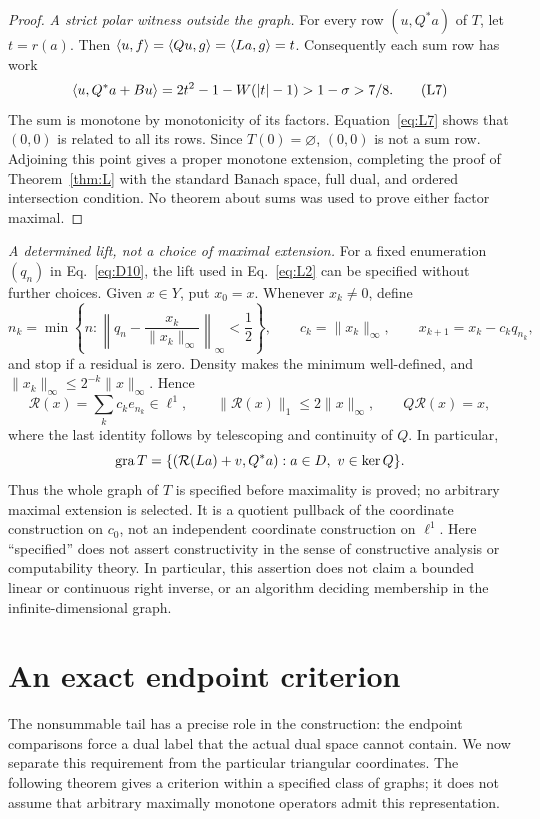 \begin{proof}
\noindent\textit{A strict polar witness outside the graph.}
\label{sec:L5}
For every row $(u,Q^*a)$ of $T$, let $t=r(a)$. Then
$\langle u,f\rangle=\langle Qu,g\rangle=\langle La,g\rangle=t$.
Consequently each sum row has work
\begin{equation}
\langle u,Q^*a+Bu\rangle
 =2t^2-1-W(|t|-1)>1-\sigma>7/8.
\tag{L7}\label{eq:L7}
\end{equation}
The sum is monotone by monotonicity of its factors.
Equation~\eqref{eq:L7} shows that $(0,0)$ is related to all its rows.
Since $T(0)=\varnothing$, $(0,0)$ is not a sum row. Adjoining this point
gives a proper monotone extension, completing the proof of
Theorem~\ref{thm:L} with the standard Banach space, full dual, and ordered
intersection condition. No theorem about sums was used to prove either
factor maximal.
\end{proof}

\noindent\textit{A determined lift, not a choice of maximal extension.}
For a fixed enumeration $(q_n)$ in Eq.~\eqref{eq:D10}, the lift used in
Eq.~\eqref{eq:L2} can be specified without further choices. Given $x\in Y$,
put $x_0=x$. Whenever $x_k\ne0$, define
\[
n_k=\min\left\{n:\left\|q_n-\frac{x_k}{\|x_k\|_\infty}\right\|_\infty
 <\frac12\right\},\qquad
c_k=\|x_k\|_\infty,\qquad x_{k+1}=x_k-c_kq_{n_k},
\]
and stop if a residual is zero. Density makes the minimum well-defined,
and $\|x_k\|_\infty\le2^{-k}\|x\|_\infty$. Hence
\[
\mathcal R(x)=\sum_k c_ke_{n_k}\in\ell^1,\qquad
\|\mathcal R(x)\|_1\le2\|x\|_\infty,\qquad
Q\mathcal R(x)=x,
\]
where the last identity follows by telescoping and continuity of $Q$.
In particular,
\[
\operatorname{gra} T=\{(\mathcal R(La)+v,Q^*a):a\in D,\ v\in\ker Q\}.
\]
Thus the whole graph of $T$ is specified before maximality is proved;
no arbitrary maximal extension is selected. It is a quotient pullback of
the coordinate construction on $c_0$, not an independent coordinate
construction on $\ell^1$. Here ``specified'' does not assert constructivity
in the sense of constructive analysis or computability theory. In particular,
this assertion does not
claim a bounded linear or continuous right inverse, or an algorithm
deciding membership in the infinite-dimensional graph.


\section{An exact endpoint criterion}
\label{sec:endpoint-criterion}
The nonsummable tail has a precise role in the construction: the endpoint
comparisons force a dual label that the actual dual space cannot contain.
We now separate this requirement from the particular triangular coordinates.
The following theorem gives a criterion within a specified class of graphs;
it does not assume that arbitrary maximally monotone operators admit this
representation.

